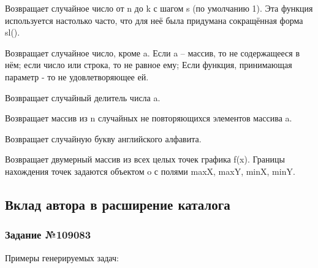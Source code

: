 \hypertarget{sluchch}{}

Возвращает случайное число от n до k с шагом s (по умолчанию 1).
Эта функция используется настолько часто, что для неё была придумана сокращённая форма sl().

\hypertarget{slKrome}{}

Возвращает случайное число, кроме a. Если a \--- массив, то не содержащееся в нём; если число или строка, то не равное ему; Если функция, принимающая параметр - то не удовлетворяющее ей.


Возвращает случайный делитель числа a.


Возвращает массив из n случайных не повторяющихся элементов массива a.


Возвращает случайную букву английского алфавита.%

\hypertarget{intPoints}{}

Возвращает двумерный массив из всех целых точек графика f(x). Границы нахождения точек задаются объектом o с полями maxX, maxY, minX, minY.

\subsection{Вклад автора в расширение каталога}

\subsubsection*{Задание №109083}

Примеры генерируемых задач:

\vspace{\baselineskip}
\vspace{\baselineskip}

\vspace{\baselineskip}

